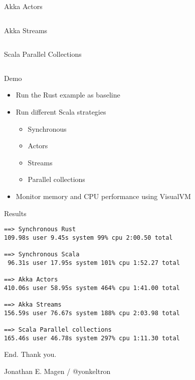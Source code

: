 \documentclass[aspectratio=169]{beamer}
\newcommand{\megatext}[1]{
  \begin{center}
    \Huge
    #1
  \end{center}
}
\begin{document}
\begin{frame}[fragile]{Akka Actors}
  \inputminted{scala}{snippets/actor.scala}
\end{frame}


\begin{frame}[fragile]{Akka Streams}
  \inputminted{scala}{snippets/streams.scala}
\end{frame}

\begin{frame}[fragile]{Scala Parallel Collections}
  \inputminted{scala}{snippets/pcoll.scala}
\end{frame}

\begin{frame}
  \megatext{Demo}

  \begin{itemize}
  \item Run the Rust example as baseline
  \item Run different Scala strategies
    \begin{itemize}
    \item Synchronous
    \item Actors
    \item Streams
    \item Parallel collections
    \end{itemize}
  \item Monitor memory and CPU performance using VisualVM
  \end{itemize}
\end{frame}

\begin{frame}[fragile]{Results}
  \begin{verbatim}
==> Synchronous Rust
109.98s user 9.45s system 99% cpu 2:00.50 total

==> Synchronous Scala
 96.31s user 17.95s system 101% cpu 1:52.27 total

==> Akka Actors
410.06s user 58.95s system 464% cpu 1:41.00 total

==> Akka Streams
156.59s user 76.67s system 188% cpu 2:03.98 total

==> Scala Parallel collections
165.46s user 46.78s system 297% cpu 1:11.30 total
  \end{verbatim}
\end{frame}


\begin{frame}
  \megatext{End. Thank you.}
  \Large
  \centering
  Jonathan E. Magen /  @yonkeltron
\end{frame}
\end{document}
